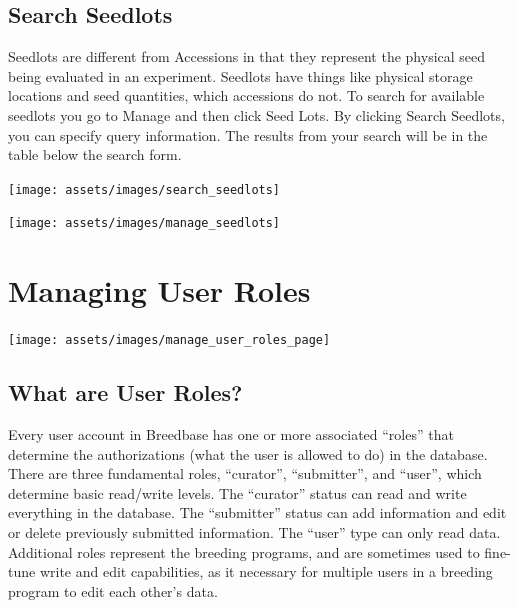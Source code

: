 \documentclass[
  12pt,
]{book}
\begin{document}
\hypertarget{search-seedlots}{%
\section{Search Seedlots}\label{search-seedlots}}

Seedlots are different from Accessions in that they represent the physical seed being evaluated in an experiment. Seedlots have things like physical storage locations and seed quantities, which accessions do not. To search for available seedlots you go to Manage and then click Seed Lots. By clicking Search Seedlots, you can specify query information. The results from your search will be in the table below the search form.

\begin{center}\texttt{[image: assets/images/search\_seedlots]} \end{center}

\begin{center}\texttt{[image: assets/images/manage\_seedlots]} \end{center}

\hypertarget{managing-user-roles}{%
\chapter{Managing User Roles}\label{managing-user-roles}}

\begin{center}\texttt{[image: assets/images/manage\_user\_roles\_page]} \end{center}

\hypertarget{what-are-user-roles}{%
\section{What are User Roles?}\label{what-are-user-roles}}

Every user account in Breedbase has one or more associated ``roles'' that determine the authorizations (what the user is allowed to do) in the database. There are three fundamental roles, ``curator'', ``submitter'', and ``user'', which determine basic read/write levels. The ``curator'' status can read and write everything in the database. The ``submitter'' status can add information and edit or delete previously submitted information. The ``user'' type can only read data. Additional roles represent the breeding programs, and are sometimes used to fine-tune write and edit capabilities, as it necessary for multiple users in a breeding program to edit each other's data.
\end{document}
